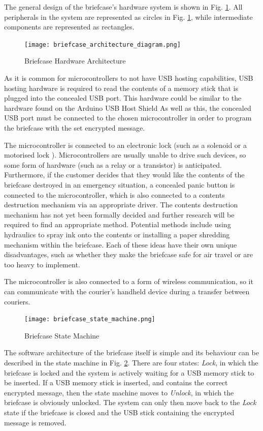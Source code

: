 The general design of the briefcase's hardware system is shown in Fig. \ref{fig:briefcase_architecture}. All peripherals in the system are represented as circles in Fig. \ref{fig:briefcase_architecture}, while intermediate components are represented as rectangles.
\begin{figure}[h]
    \centering
    \texttt{[image: briefcase\_architecture\_diagram.png]}
    \caption{Briefcase Hardware Architecture}
    \label{fig:briefcase_architecture}
\end{figure}

As it is common for microcontrollers to not have USB hosting capabilities, USB hosting hardware is required to read the contents of a memory stick that is plugged into the concealed USB port. This hardware could be similar to the hardware found on the Arduino USB Host Shield \cite{arduinoUSBHost} As well as this, the concealed USB port must be connected to the chosen microcontroller in order to program the briefcase with the set encrypted message.

The microcontroller is connected to an electronic lock (such as a solenoid \cite{solenoidDigikey} or a motorised lock \cite{motorisedLock}). Microcontrollers are usually unable to drive such devices, so some form of hardware (such as a relay or a transistor) is anticipated. Furthermore, if the customer decides that they would like the contents of the briefcase destroyed in an emergency situation, a concealed panic button is connected to the microcontroller, which is also connected to a contents destruction mechanism via an appropriate driver. The contents destruction mechanism has not yet been formally decided and further research will be required to find an appropriate method. Potential methods include using hydraulics to spray ink onto the contents or installing a paper shredding mechanism within the briefcase. Each of these ideas have their own unique disadvantages, such as whether they make the briefcase safe for air travel or are too heavy to implement.

The microcontroller is also connected to a form of wireless communication, so it can communicate with the courier's handheld device during a transfer between couriers.

\begin{figure}[h]
    \centering
    \texttt{[image: briefcase\_state\_machine.png]}
    \caption{Briefcase State Machine}
    \label{fig:briefcase_state_machine}
\end{figure}
The software architecture of the briefcase itself is simple and its behaviour can be described in the state machine in Fig. \ref{fig:briefcase_state_machine}. There are four states: \textit{Lock}, in which the briefcase is locked and the system is actively waiting for a USB memory stick to be inserted. If a USB memory stick is inserted, and contains the correct encrypted message, then the state machine moves to \textit{Unlock}, in which the briefcase is obviously unlocked. The system can only then move back to the \textit{Lock} state if the briefcase is closed and the USB stick containing the encrypted message is removed.

